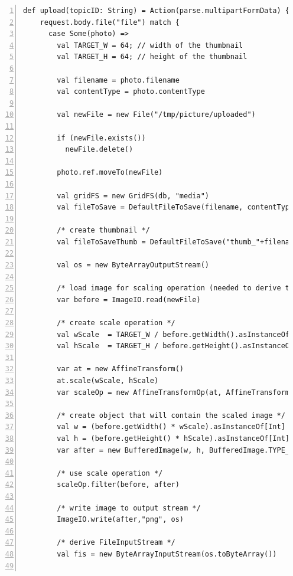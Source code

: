 \clearpage

\begin{lstlisting}[numbers=left,caption={Complete upload Action of the FileController},label=Scala:Upload:full,frame=tlbr,breaklines]
def upload(topicID: String) = Action(parse.multipartFormData) { request =>
    request.body.file("file") match {
      case Some(photo) =>
        val TARGET_W = 64; // width of the thumbnail
        val TARGET_H = 64; // height of the thumbnail

        val filename = photo.filename
        val contentType = photo.contentType

        val newFile = new File("/tmp/picture/uploaded")

        if (newFile.exists())
          newFile.delete()

        photo.ref.moveTo(newFile)

        val gridFS = new GridFS(db, "media")
        val fileToSave = DefaultFileToSave(filename, contentType)

        /* create thumbnail */
        val fileToSaveThumb = DefaultFileToSave("thumb_"+filename, contentType)

        val os = new ByteArrayOutputStream()

        /* load image for scaling operation (needed to derive thumbnail) */
        var before = ImageIO.read(newFile)

        /* create scale operation */
        val wScale  = TARGET_W / before.getWidth().asInstanceOf[Double]
        val hScale  = TARGET_H / before.getHeight().asInstanceOf[Double]

        var at = new AffineTransform()
        at.scale(wScale, hScale)
        var scaleOp = new AffineTransformOp(at, AffineTransformOp.TYPE_BILINEAR)

        /* create object that will contain the scaled image */
        val w = (before.getWidth() * wScale).asInstanceOf[Int]
        val h = (before.getHeight() * hScale).asInstanceOf[Int]
        var after = new BufferedImage(w, h, BufferedImage.TYPE_INT_ARGB)

        /* use scale operation */
        scaleOp.filter(before, after)

        /* write image to output stream */
        ImageIO.write(after,"png", os)

        /* derive FileInputStream */
        val fis = new ByteArrayInputStream(os.toByteArray())


\end{lstlisting}
